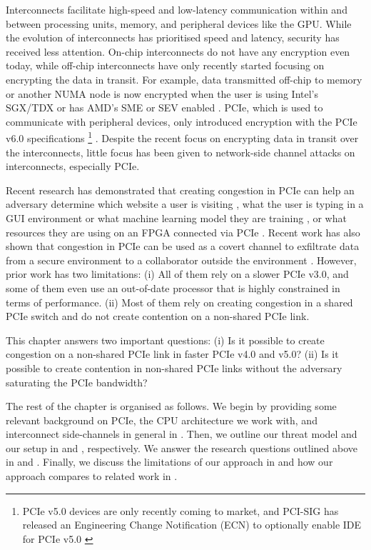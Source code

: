 
Interconnects facilitate high-speed and low-latency communication within and between processing units, memory, and peripheral devices like the GPU.
While the evolution of interconnects has prioritised speed and latency, security has received less attention.
On-chip interconnects do not have any encryption even today, while off-chip interconnects have only recently started focusing on encrypting the data in transit.
For example, data transmitted off-chip to memory or another NUMA node is now encrypted when the user is using Intel's SGX/TDX or has AMD's SME or SEV enabled \cite{intel_upi_encryption, amd_gen_5_arch}.
PCIe, which is used to communicate with peripheral devices, only introduced encryption with the PCIe v6.0 specifications 
\footnote{PCIe v5.0 devices are only recently coming to market, and PCI-SIG has released an Engineering Change Notification (ECN) to optionally enable IDE for PCIe v5.0 \cite{pcie_ide_v5_ecn}}
\cite{pcie_ide_v6}.
Despite the recent focus on encrypting data in transit over the interconnects, little focus has been given to network-side channel attacks on interconnects, especially PCIe.

Recent research has demonstrated that creating congestion in PCIe can help an adversary determine which website a user is visiting \cite{tan2021invisible, side2022lockeddown}, what the user is typing in a GUI environment or what machine learning model they are training \cite{tan2021invisible}, or what resources they are using on an FPGA connected via PCIe \cite{giechaskiel2022cross}.
Recent work has also shown that congestion in PCIe can be used as a covert channel to exfiltrate data from a secure environment to a collaborator outside the environment \cite{giechaskiel2022cross, khaliq2021timing}.
However, prior work has two limitations: 
(i) All of them rely on a slower PCIe v3.0, and some of them even use an out-of-date processor that is highly constrained in terms of performance. 
(ii) Most of them rely on creating congestion in a shared PCIe switch and do not create contention on a non-shared PCIe link.

This chapter answers two important questions:
(i) Is it possible to create congestion on a non-shared PCIe link in faster PCIe v4.0 and v5.0?
(ii) Is it possible to create contention in non-shared PCIe links without the adversary saturating the PCIe bandwidth?

The rest of the chapter is organised as follows.
We begin by providing some relevant background on PCIe, the CPU architecture we work with, and interconnect side-channels in general in . 
Then, we outline our threat model and our setup in  and , respectively.
We answer the research questions outlined above in  and .
Finally, we discuss the limitations of our approach in  and how our approach compares to related work in .
